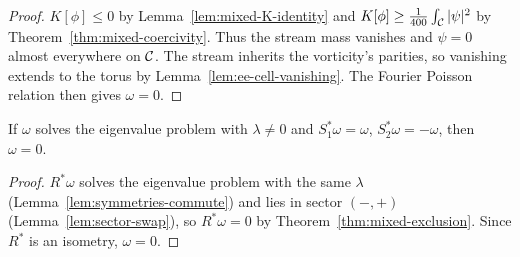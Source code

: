 \begin{proof}
\leanok
$K[\phi]\le0$ by Lemma~\ref{lem:mixed-K-identity} and
$K[\phi]\ge\frac1{400}\int_{\mathcal{C}}|\psi|^2$ by Theorem~\ref{thm:mixed-coercivity}.
Thus the stream mass vanishes and $\psi=0$ almost everywhere on $\mathcal{C}$.
The stream inherits the vorticity's parities, so vanishing extends to the
torus by Lemma~\ref{lem:ee-cell-vanishing}. The Fourier Poisson relation
then gives $\omega=0$.
\end{proof}

\begin{corollary}
\label{cor:mixed-other-exclusion}
\leanok
If $\omega$ solves the eigenvalue problem with $\lambda\ne0$ and
$S_1^*\omega=\omega$, $S_2^*\omega=-\omega$, then $\omega=0$.
\end{corollary}

\begin{proof}
\leanok
$R^*\omega$ solves the eigenvalue problem with the same $\lambda$
(Lemma~\ref{lem:symmetries-commute}) and lies in sector $(-,+)$
(Lemma~\ref{lem:sector-swap}), so $R^*\omega=0$ by
Theorem~\ref{thm:mixed-exclusion}. Since $R^*$ is an isometry, $\omega=0$.
\end{proof}
